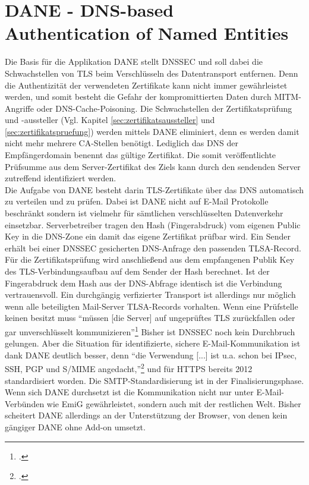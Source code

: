 \documentclass  [paper=a4,
				fontsize=12pt,
				listof=totoc,
				bibliography=totoc
				]{scrreprt}
\begin{document}
		\section{DANE - DNS-based Authentication of Named Entities}
		\label{sec:dane}                                             
			Die Basis für die Applikation \ac{DANE} stellt \ac{DNSSEC} und soll dabei die Schwachstellen von \ac{TLS} beim Verschlüsseln des Datentransport entfernen. Denn die Authentizität der verwendeten Zertifikate kann nicht immer gewährleistet werden, und somit besteht die Gefahr der kompromittierten Daten durch \ac{MITM}-Angriffe oder \ac{DNS}-Cache-Poisoning.
			Die Schwachstellen der Zertifikatsprüfung und -aussteller (Vgl. Kapitel \ref{sec:zertifikatsaussteller} und \ref{sec:zertifikatspruefung}) werden mittels \ac{DANE} eliminiert, denn es werden damit nicht mehr mehrere CA-Stellen benötigt. Lediglich das DNS der Empfängerdomain benennt das gültige Zertifikat. Die somit  veröffentlichte Prüfsumme aus dem Server-Zertifikat des Ziels kann durch den sendenden Server zutreffend identifiziert werden.\medskip\\
			Die Aufgabe von \ac{DANE} besteht darin \ac{TLS}-Zertifikate über das \ac{DNS} automatisch zu verteilen und zu prüfen. Dabei ist \ac{DANE} nicht auf E-Mail Protokolle beschränkt sondern ist vielmehr für sämtlichen verschlüsselten Datenverkehr einsetzbar.
			Serverbetreiber tragen den Hash (Fingerabdruck) vom eigenen Public Key in die \ac{DNS}-Zone ein damit das eigene Zertifikat prüfbar wird. Ein Sender erhält bei einer \ac{DNSSEC} gesicherten \ac{DNS}-Anfrage den passenden \ac{TLSA}-Record. Für die Zertifikatsprüfung wird anschließend aus dem empfangenen Publik Key des \ac{TLS}-Verbindungsaufbau auf dem Sender der Hash berechnet. Ist der Fingerabdruck dem Hash aus der \ac{DNS}-Abfrage identisch ist die Verbindung vertrauensvoll.
			Ein durchgängig verfizierter Transport ist allerdings nur möglich wenn alle beteiligten Mail-Server \ac{TLSA}-Records vorhalten. Wenn eine Prüfstelle keinen besitzt muss ``müssen [die Server] auf ungeprüftes \ac{TLS} zurückfallen oder gar unverschlüsselt kommunizieren''\footcite[S. 197]{Koetter2014}
			Bisher ist \ac{DNSSEC} noch kein Durchbruch gelungen. Aber die Situation für identifizierte, sichere E-Mail-Kommunikation ist dank \ac{DANE} deutlich besser, denn ``die Verwendung [...] ist u.a. schon bei \ac{IPsec}, \ac{SSH}, \ac{PGP} und \ac{S/MIME} angedacht,''\footcite[S. 196]{Koetter2014} und für \ac{HTTPS} bereits 2012 standardisiert worden. Die \ac{SMTP}-Standardisierung ist in der Finalisierungsphase. Wenn sich \ac{DANE} durchsetzt ist die Kommunikation nicht nur unter E-Mail-Verbünden wie \ac{EmiG} gewährleistet, sondern auch mit der restlichen Welt. Bisher scheitert \ac{DANE} allerdings an der Unterstützung der Browser, von denen kein gängiger \ac{DANE} ohne Add-on umsetzt.
	\pagebreak
\end{document}
